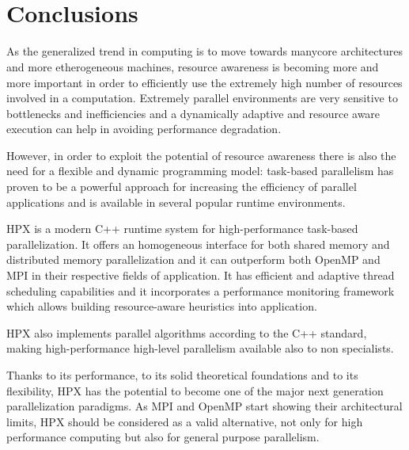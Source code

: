 
~\\~
\section{Conclusions} \label{sec:conclusions}
As the generalized trend in computing is to move towards manycore architectures and more etherogeneous machines, resource awareness is becoming more and more important in order to efficiently use the extremely high number of resources involved in a computation.
Extremely parallel environments are very sensitive to bottlenecks and inefficiencies and a dynamically adaptive and resource aware execution can help in avoiding performance degradation.

However, in order to exploit the potential of resource awareness there is also the need for a flexible and dynamic programming model: task-based parallelism has proven to be a powerful approach for increasing the efficiency of parallel applications and is available in several popular runtime environments.

HPX is a modern C++ runtime system for high-performance task-based parallelization. It offers an homogeneous interface for both shared memory and distributed memory parallelization and it can outperform both OpenMP and MPI in their respective fields of application. It has efficient and adaptive thread scheduling capabilities and it incorporates a performance monitoring framework which allows building resource-aware heuristics into application.

HPX also implements parallel algorithms according to the C++ standard, making high-performance high-level parallelism available also to non specialists.

Thanks to its performance, to its solid theoretical foundations and to its flexibility, HPX has the potential to become one of the major next generation parallelization paradigms. As MPI and OpenMP start showing their architectural limits, HPX should be considered as a valid alternative, not only for high performance computing but also for general purpose parallelism.

~\\~
